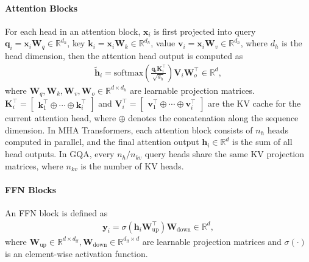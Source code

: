 \documentclass[11pt]{article}
\begin{document}
\paragraph{Attention Blocks}
For each head in an attention block, $\mathbf{x}_i$ is first projected into query $\mathbf{q}_i=\mathbf{x}_i\mathbf{W}_q \in \mathbb R^{d_h}$, key $\mathbf{k}_i=\mathbf{x}_i\mathbf{W}_k \in \mathbb R^{d_h}$, value $\mathbf{v}_i=\mathbf{x}_i\mathbf{W}_v \in \mathbb R^{d_h}$, where $d_h$ is the head dimension, then the attention head output is computed as
\begin{equation}
\begin{aligned}
    \mathbf{\tilde h}_{i} = \text{softmax}\left(\frac{\mathbf{q}_i\mathbf{K}_i^\top}{\sqrt{d_h}}\right)\mathbf{V}_i \mathbf{W}_o^\top \in \mathbb R^{d},
    \label{eq:attn}
\end{aligned}
\end{equation}
where $\mathbf{W}_q, \mathbf{W}_k, \mathbf{W}_v, \mathbf{W}_o \in \mathbb R^{d \times d_h}$ are learnable projection matrices. $\mathbf{K}_i^\top=\begin{bmatrix}\mathbf{k}_1^\top \oplus \cdots \oplus \mathbf{k}_i^\top \end{bmatrix}$ and $\mathbf{V}_i^\top=\begin{bmatrix}\mathbf{v}_1^\top \oplus \cdots \oplus \mathbf{v}_i^\top\end{bmatrix}$ are the KV cache for the current attention head, where $\oplus$ denotes the concatenation along the sequence dimension. In MHA Transformers, each attention block consists of $n_h$ heads computed in parallel, and the final attention output $\mathbf h_i\in \mathbb R^d$ is the sum of all head outputs. In GQA, every $n_h/n_{kv}$ query heads share the same KV projection matrices, where $n_{kv}$ is the number of KV heads. 

\paragraph{FFN Blocks}
An FFN block is defined as
\begin{equation}
\begin{aligned}
    \mathbf{y}_i = \sigma \left(\mathbf{h}_{i} \mathbf{W}_\text{up}^\top\right) \mathbf{W}_\text{down} \in \mathbb R^{d},
\end{aligned}
\end{equation}
where $\mathbf{W}_\text{up} \in \mathbb R^{d\times d_\text{ff}}, \mathbf{W}_\text{down} \in \mathbb R^{d_\text{ff}\times d}$ are learnable projection matrices and $\sigma(\cdot)$ is an element-wise activation function. 
\end{document}
